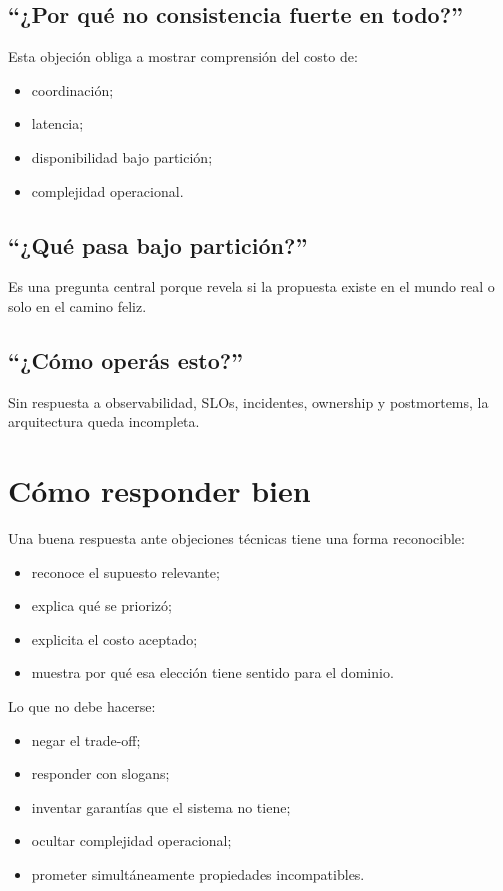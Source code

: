 \documentclass[variant=apuntes,cover=institutional,mode=screen]{ua-engineering-v6-article}
\begin{document}
\subsection{“¿Por qué no consistencia fuerte en todo?”}

Esta objeción obliga a mostrar comprensión del costo de:
\begin{itemize}
\item coordinación;
\item latencia;
\item disponibilidad bajo partición;
\item complejidad operacional.
\end{itemize}

\subsection{“¿Qué pasa bajo partición?”}

Es una pregunta central porque revela si la propuesta existe en el mundo real o solo en el camino feliz.

\subsection{“¿Cómo operás esto?”}

Sin respuesta a observabilidad, SLOs, incidentes, ownership y postmortems, la arquitectura queda incompleta.

\section{Cómo responder bien}

Una buena respuesta ante objeciones técnicas tiene una forma reconocible:

\begin{itemize}
\item reconoce el supuesto relevante;
\item explica qué se priorizó;
\item explicita el costo aceptado;
\item muestra por qué esa elección tiene sentido para el dominio.
\end{itemize}

Lo que no debe hacerse:
\begin{itemize}
\item negar el trade-off;
\item responder con slogans;
\item inventar garantías que el sistema no tiene;
\item ocultar complejidad operacional;
\item prometer simultáneamente propiedades incompatibles.
\end{itemize}
\end{document}

